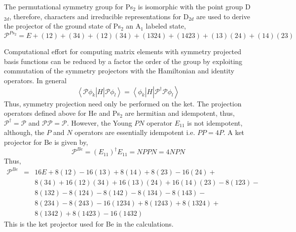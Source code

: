 \documentclass[12pt,thmsa,suthesis,verbatim]{report}
\begin{document}
The permutational symmetry group for Ps$_2$ is isomorphic with the point
group D$_{2d}$, therefore, characters and irreducible representations for D$%
_{2d}$ are used to derive the projector of the ground state of Ps$_2$ an A$%
_1 $ labeled state, 
\begin{equation}
\mathcal{P}^{Ps_2}=E+\left( 12\right) +\left( 34\right) +\left( 12\right)
\left( 34\right) +\left( 1324\right) +\left( 1423\right) +\left( 13\right)
\left( 24\right) +\left( 14\right) \left( 23\right)  \label{Ps2proj}
\end{equation}

Computational effort for computing matrix elements with symmetry projected
basis functions can be reduced by a factor the order of the group by
exploiting commutation of the symmetry projectors with the Hamiltonian and
identity operators. In general 
\begin{equation}
\left\langle \mathcal{P}\phi _k\right| H\left| \mathcal{P}\phi
_l\right\rangle =\left\langle \phi _k\right| H\left| \mathcal{P}^{\dagger }%
\mathcal{P}\phi _l\right\rangle
\end{equation}
Thus, symmetry projection need only be performed on the ket. The projection
operators defined above for He and Ps$_2$ are hermitian and idempotent,
thus, $\mathcal{P}^{\dagger }=\mathcal{P}$ and $\mathcal{P}\mathcal{P}=%
\mathcal{P}.$ However, the Young $PN$ operator $E_{11}$ is not idempotent,
although, the $P$ and $N$ operators are essentially idempotent i.e. $PP=4P$.
A ket projector for Be is given by, 
\begin{equation}
\mathcal{P}^{Be}=\left( E_{11}\right) ^{\dagger }E_{11}=NPPN=4NPN
\end{equation}
Thus, 
\begin{eqnarray}
\mathcal{P}^{Be} &=&16E+8\left( 12\right) -16\left( 13\right) +8\left(
14\right) +8\left( 23\right) -16\left( 24\right) +  \nonumber  \label{Beproj}
\\
&&8\left( 34\right) +16\left( 12\right) \left( 34\right) +16\left( 13\right)
\left( 24\right) +16\left( 14\right) \left( 23\right) -8\left( 123\right) - 
\nonumber \\
&&8\left( 132\right) -8\left( 124\right) -8\left( 142\right) -8\left(
134\right) -8\left( 143\right) -  \label{Beproj} \\
&&8\left( 234\right) -8\left( 243\right) -16\left( 1234\right) +8\left(
1243\right) +8\left( 1324\right) +  \nonumber \\
&&8\left( 1342\right) +8\left( 1423\right) -16\left( 1432\right)  \nonumber
\end{eqnarray}
This is the ket projector used for Be in the calculations.
\end{document}

